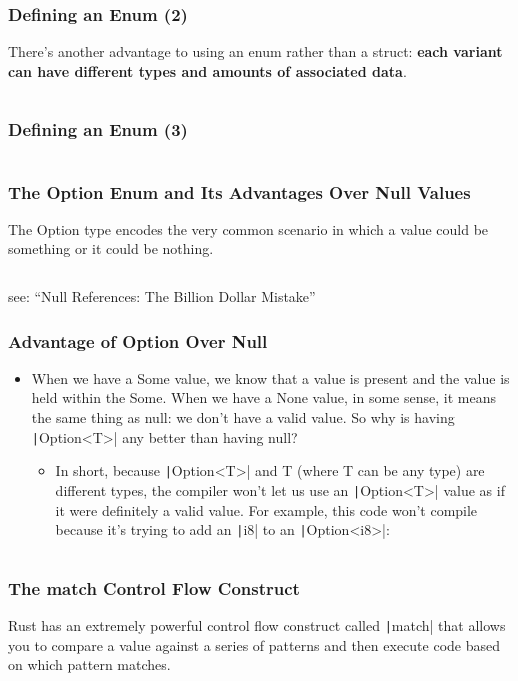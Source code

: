 \documentclass{beamer}
\begin{document}
\begin{frame}[fragile]
	\frametitle{Defining an Enum (2)}
	There’s another advantage to using an enum rather than a struct:\textbf{ each variant can have different types and amounts of associated data}. 
	\inputminted{rust}{./code/enum2.rs}
\end{frame}

\begin{frame}[fragile]
	\frametitle{Defining an Enum (3)}
	
	\inputminted{rust}{./code/enum3.rs}
\end{frame}

\begin{frame}[fragile]
	\frametitle{The Option Enum and Its Advantages Over Null Values}
	 The Option type encodes the very common scenario in which a value could be something or it could be nothing.
	\inputminted{rust}{./code/enum4.rs}
	
	see: “Null References: The Billion Dollar Mistake”
\end{frame}

\begin{frame}[fragile]
	\frametitle{Advantage of Option Over Null}
\begin{itemize}
	\item 	When we have a Some value, we know that a value is present and the value is held within the Some. When we have a None value, in some sense, it means the same thing as null: we don’t have a valid value. So why is having \texttt|Option<T>| any better than having null?
\begin{itemize}
	\item 	In short, because \texttt|Option<T>| and T (where T can be any type) are different types, the compiler won’t let us use an \texttt|Option<T>| value as if it were definitely a valid value. For example, this code won’t compile because it’s trying to add an \texttt|i8| to an \texttt|Option<i8>|:
\end{itemize}
\end{itemize}
	
	\inputminted{rust}{./code/enum5.rs}
\end{frame}

\begin{frame}[fragile]
	\frametitle{The match Control Flow Construct}
	Rust has an extremely powerful control flow construct called \texttt|match| that allows you to compare a value against a series of patterns and then execute code based on which pattern matches.
	\inputminted{rust}{./code/match.rs}
\end{frame}
\end{document}
